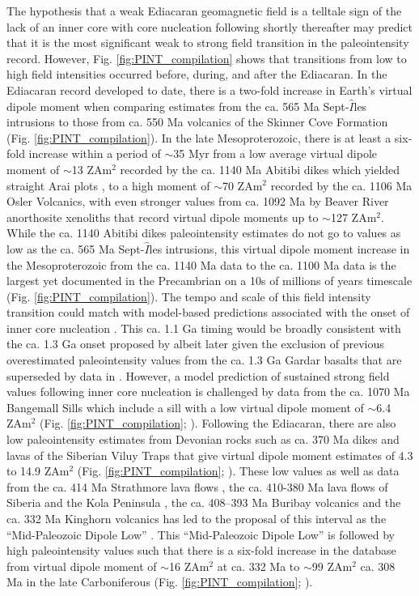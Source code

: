 \documentclass[9pt,twocolumn,twoside,lineno]{pnas-new}
\begin{document}
The hypothesis that a weak Ediacaran geomagnetic field is a telltale sign of the lack of an inner core with core nucleation following shortly thereafter may predict that it is the most significant weak to strong field transition in the paleointensity record. However, Fig. \ref{fig:PINT_compilation} shows that transitions from low to high field intensities occurred before, during, and after the Ediacaran. In the Ediacaran record developed to date, there is a two-fold increase in Earth's virtual dipole moment when comparing estimates from the ca. 565 Ma Sept-$\hat{I}$les intrusions \cite{Bono2019a} to those from ca. 550 Ma volcanics of the Skinner Cove Formation \cite{Thallner2021a} (Fig. \ref{fig:PINT_compilation}). In the late Mesoproterozoic, there is at least a six-fold increase within a period of $\sim$35 Myr from a low average virtual dipole moment of $\sim$13 ZAm$^2$ recorded by the ca. 1140 Ma Abitibi dikes which yielded straight Arai plots \cite{Macouin2003a}, to a high moment of $\sim$70 ZAm$^2$ recorded by the ca. 1106 Ma Osler Volcanics, with even stronger values from ca. 1092 Ma by Beaver River anorthosite xenoliths that record virtual dipole moments up to $\sim$127 ZAm$^2$. While the ca. 1140 Abitibi dikes paleointensity estimates do not go to values as low as the ca. 565 Ma Sept-$\hat{I}$les intrusions, this virtual dipole moment increase in the Mesoproterozoic from the ca. 1140 Ma data to the ca. 1100 Ma data is the largest yet documented in the Precambrian on a 10s of millions of years timescale (Fig. \ref{fig:PINT_compilation}). The tempo and scale of this field intensity transition could match with model-based predictions associated with the onset of inner core nucleation \cite{Davies2021a}. This ca. 1.1 Ga timing would be broadly consistent with the ca. 1.3 Ga onset proposed by \citealp{Biggin2015a} albeit later given the exclusion of previous overestimated paleointensity values from the ca. 1.3 Ga Gardar basalts that are superseded by data in \cite{Kodama2019a}. However, a model prediction of sustained strong field values following inner core nucleation is challenged by data from the ca. 1070 Ma Bangemall Sills which include a sill with a low virtual dipole moment of $\sim$6.4 ZAm$^2$ (Fig. \ref{fig:PINT_compilation};  \citealp{Lloyd2021b}). Following the Ediacaran, there are also low paleointensity estimates from Devonian rocks such as ca. 370 Ma dikes and lavas of the Siberian Viluy Traps that give virtual dipole moment estimates of 4.3 to 14.9 ZAm$^2$ (Fig. \ref{fig:PINT_compilation}; \citealp{Hawkins2019a}). These low values as well as data from the ca. 414 Ma Strathmore lava flows \cite{Hawkins2021a}, the ca. 410-380 Ma lava flows of Siberia and the Kola Peninsula \cite{Shcherbakova2017a}, the ca. 408–393 Ma Buribay volcanics \cite{Shcherbakova2021a} and the ca. 332 Ma Kinghorn volcanics \cite{Hawkins2021a} has led to the proposal of this interval as the ``Mid-Paleozoic Dipole Low'' \cite{Hawkins2021a}. This ``Mid-Paleozoic Dipole Low'' is followed by high paleointensity values such that there is a six-fold increase in the database from virtual dipole moment of $\sim$16 ZAm$^2$ at ca. 332 Ma to $\sim$99 ZAm$^2$ ca. 308 Ma in the late Carboniferous (Fig. \ref{fig:PINT_compilation}; \citealp{Hawkins2021a}). 
\end{document}
